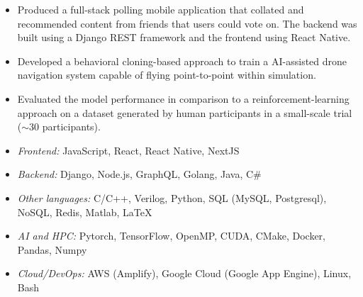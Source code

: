 \documentclass[9pt,a4paper,ragged2e]{altacv}
\begin{document}
\begin{paracol}{2}
	\divider

	\begin{itemize}
		\item Produced a full-stack polling mobile application that collated and recommended content from friends that users could vote on. The backend was built using a Django REST framework and the frontend using React Native.
	\end{itemize}

	\divider

	\begin{itemize}
		\item Developed a behavioral cloning-based approach to train a AI-assisted drone navigation system capable of flying point-to-point within simulation.
		\item Evaluated the model performance in comparison to a reinforcement-learning approach on a dataset generated by human participants in a small-scale trial ($\sim$30 participants).
	\end{itemize}

	\smallskip
	\begin{itemize}
		\item \textit{Frontend:} JavaScript, React, React Native, NextJS
		\item \textit{Backend:} Django, Node.js, GraphQL, Golang, Java, C\#
		\item \textit{Other languages:} C/C++, Verilog, Python, SQL (MySQL, Postgresql), NoSQL, Redis, Matlab, \LaTeX
		\item \textit{AI and HPC:} Pytorch, TensorFlow, OpenMP, CUDA, CMake, Docker, Pandas, Numpy
		\item \textit{Cloud/DevOps:} AWS (Amplify), Google Cloud (Google App Engine), Linux, Bash
	\end{itemize}




	\switchcolumn


\end{paracol}
\end{document}
